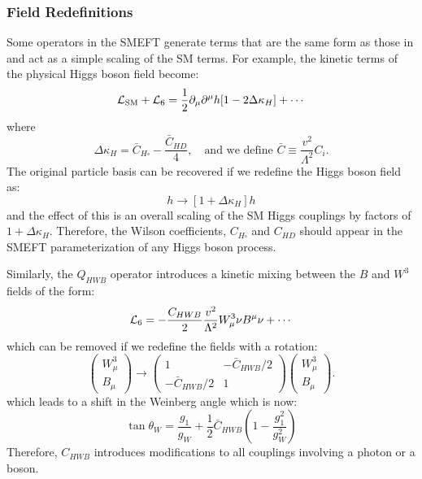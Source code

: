 

\subsubsection{Field Redefinitions}\label{sec:field_redefinitions}

Some operators in the SMEFT generate terms that are the same form as those in \LSM and act as a simple scaling of the SM terms. For example, the kinetic terms of the physical Higgs boson field become:
\begin{equation}
  \mathcal{L}_\mathrm{SM} + \mathcal{L}_6 = \frac{1}{2} \partial_\mu \partial^\mu h [1-2\Delta\kappa_H] + \cdots
\end{equation}
where
\begin{equation}
  \Delta \kappa_H = \bar{C}_{H \square} - \frac{\bar{C}_{HD}}{4},\quad \text{and we define }\bar{C} \equiv \frac{v^2}{\Lambda^2} C_i .
\end{equation}
The original particle basis can be recovered if we redefine the Higgs boson field as:
\begin{equation}
  h \to [1 + \Delta\kappa_H] h
\end{equation}
and the effect of this is an overall scaling of the SM Higgs couplings by factors of $1 + \Delta\kappa_H$. Therefore, the Wilson coefficients, $C_{H \square}$ and $C_{HD}$ should appear in the SMEFT parameterization of any Higgs boson process.

Similarly, the $Q_{HWB}$ operator introduces a kinetic mixing between the $B$ and $W^3$ fields of the form:
\begin{equation}
  \mathcal{L}_6 = -\frac{C_{HWB}}{2} \frac{v^2}{\Lambda^2} W^3_\mu\nu B^\mu\nu + \cdots
\end{equation}
which can be removed if we redefine the fields with a rotation:
\begin{equation}
  \begin{pmatrix}
    W_\mu^3 \\
    B_\mu
  \end{pmatrix}
  \to 
  \begin{pmatrix}
    1 & -\bar{C}_{HWB}/2 \\
    -\bar{C}_{HWB}/2 & 1
  \end{pmatrix}
  \begin{pmatrix}
    W^3_\mu \\
    B_\mu
  \end{pmatrix} .
\end{equation}
which leads to a shift in the Weinberg angle which is now:
\begin{equation}
  \tan{\theta_W} = \frac{g_1}{g_W} + \frac{1}{2} \bar{C}_{HWB} \left(1 - \frac{g_1^2}{g_W^2}\right)
\end{equation}
Therefore, $C_{HWB}$ introduces modifications to all couplings involving a photon or a \PZ boson.

